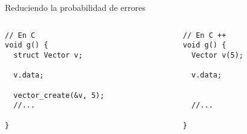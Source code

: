 \begin{frame}[fragile]{Reduciendo la probabilidad de errores}
   \begin{columns}[t]
      \begin{column}{.4\linewidth}
         \begin{lstlisting}[style=normal,firstnumber=29,linebackgroundcolor={%
                 \btLstHLB<1>{31}%
                 \btLstHLR<2>{33,35}%
                 \btLstHLR<3>{38}%
         }]
// En C
void g() {
  struct Vector v;

  v.data;

  vector_create(&v, 5);
  //...

}
         \end{lstlisting}
     \end{column}
      \begin{column}{.4\linewidth}
         \begin{lstlisting}[style=normal,firstnumber=29,linebackgroundcolor={%
                 \btLstHLB<1>{31}%
                 \btLstHLB<2>{31,33}%
                 \btLstHLB<3>{38}%
         }]
// En C ++
void g() {
  Vector v(5);

  v.data;


  //...

}
         \end{lstlisting}
     \end{column}
 \end{columns}
\end{frame}

